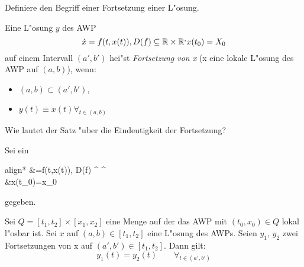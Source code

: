 \documentclass[9pt]{article}
\newcommand{\R}[1]{%
	\ifthenelse{\equal{#1}{}}
		{\mathbb{R}}
		{\mathbb{R}^#1}}%
\newenvironment{field}{}{\newpage}
\newif\ifnote
\newenvironment{note}{\notetrue}{\notefalse}
\newcommand{\localtag}{}
\newcommand{\globaltag}{}
\newcommand{\uuid}{}
\newcommand{\tags}[1]{
    \ifnote 
        \renewcommand{\localtag}{#1}
    \else
        \renewcommand{\globaltag}{#1}
    \fi 
    }
\newcommand{\xplain}[1]{\renewcommand{\uuid}{#1}}
\begin{document}
\begin{note}
	\xplain{UUID}
	\tags{definition, fortsetzung, 3.5.1}
	
	\begin{field}  %
		Definiere den Begriff einer Fortsetzung einer L"osung. 
	\end{field}
	
	\begin{field}  %
		Eine L"osung $y$ des AWP 
		\begin{equation*}
		\dot{x}=f(t,x(t)), D(f) \subseteq \R{} \times \R, x(t_0)=X_0
		\end{equation*}
		auf einem Intervall $(a',b')$ hei"st \textit{Fortsetzung von x} (x eine lokale L"osung des AWP auf $(a,b)$), wenn:
		\begin{itemize}
			\item $(a,b) \subset (a',b')$,
			\item $y(t) \equiv x(t) \forall_{t\in (a,b)}$
		\end{itemize}
	\end{field}
\end{note}
\begin{note}
	\xplain{UUID}
	\tags{satz, fortsetzung, 3.5.2}
	
	\begin{field}  %
		Wie lautet der Satz "uber die Eindeutigkeit der Fortsetzung?
	\end{field}
		
	\begin{field}  %
		Sei ein  
		\begin{empheq}[left= \text{AWP:~} \empheqlbrace]{align*}
		&=f(t,x(t)), D(f) \subseteq \R{} \times \R{} \\ 
		 &x(t_0)=x_0
		\end{empheq}
		gegeben.
		
		 Sei $Q=[t_1,t_2] \times [x_1,x_2]$ eine Menge auf der das AWP mit $(t_0, x_0) \in Q$
		lokal l"osbar ist. Sei $x$ auf $(a,b) \in [t_1,t_2]$ eine L"osung des AWPs. Seien $y_1$, $y_2$
		zwei Fortsetzungen von x auf $(a',b')\in [t_1,t_2]$. Dann gilt: 
		\begin{equation*}
		y_1(t) = y_2(t) \qquad \forall_{t\in (a',b')}
		\end{equation*}
	\end{field}
\end{note}
\end{document}
